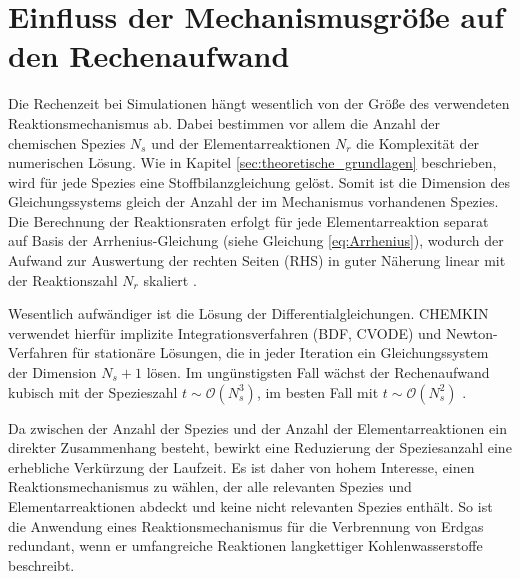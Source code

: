     \section{Einfluss der Mechanismusgröße auf den Rechenaufwand}
        Die Rechenzeit bei Simulationen hängt wesentlich von der Größe des verwendeten Reaktionsmechanismus ab. Dabei bestimmen vor allem die Anzahl der chemischen Spezi\-es $N_s$ und der Elementarreaktionen $N_r$ die Komplexität der numerischen Lösung. Wie in Kapitel \ref{sec:theoretische_grundlagen} beschrieben, wird für jede Spezies eine Stoffbilanzgleichung gelöst. Somit ist die Dimension des Gleichungssystems gleich der Anzahl der im Mechanismus vorhandenen Spezies. Die Berechnung der Reaktionsraten erfolgt für jede Elementarreaktion separat auf Basis der Arrhenius-Gleichung (siehe Gleichung \ref{eq:Arrhenius}), wodurch der Aufwand zur Auswertung der rechten Seiten (RHS) in guter Näherung linear mit der Reaktionszahl $N_r$ skaliert \parencite{ChemkinTheoryManual, Niemeyer2016}.

        Wesentlich aufwändiger ist die Lösung der Differentialgleichungen. CHEMKIN verwendet hierfür implizite Integrationsverfahren (BDF, CVODE) und Newton-Verfahren für stationäre Lösungen, die in jeder Iteration ein Gleichungssystem der Dimension $N_s+1$ lösen. Im ungünstigsten Fall wächst der Rechenaufwand kubisch mit der Spezieszahl $t \sim \mathcal{O}\left(N_s^3\right)$, im besten Fall mit $t \sim \mathcal{O}\left(N_s^2\right)$ \cite{CURTIS2017312}.

        Da zwischen der Anzahl der Spezies und der Anzahl der Elementarreaktionen ein direkter Zusammenhang besteht, bewirkt eine Reduzierung der Speziesanzahl eine erhebliche Verkürzung der Laufzeit. Es ist daher von hohem Interesse, einen Reaktionsmechanismus zu wählen, der alle relevanten Spezies und Elementarreaktionen abdeckt und keine nicht relevanten Spezies enthält. %
        So ist die Anwendung eines Reaktionsmechanismus für die Verbrennung von Erdgas redundant, wenn er umfangreiche Reaktionen langkettiger Kohlenwasserstoffe beschreibt. 
\iffalse
